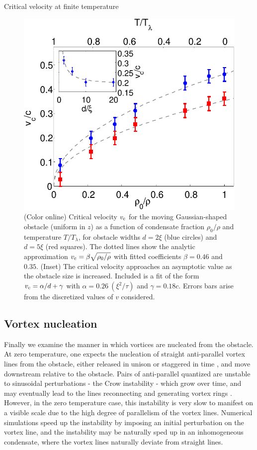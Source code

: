 \begin{chapter}{\label{cha:nonequib}Critical velocity at finite temperature}
\begin{figure}[h]
\centering
  \includegraphics[width=0.45\linewidth]{nonequib/figures/vc-n0}
  \caption{\label{fig:vc-n0}(Color online) Critical velocity $v_{\rm c}$ for the moving Gaussian-shaped obstacle (uniform in $z$) as a function of condensate fraction $\rho_0/\rho$ and temperature $T/T_\lambda$, for obstacle widths $d=2\xi$ (blue circles) and $d=5\xi$ (red squares). The dotted lines show the analytic approximation $v_{\rm c}=\beta \sqrt{\rho_0/\rho}$ with fitted coefficients $\beta=0.46$ and $0.35$. (Inset) The critical velocity approaches an asymptotic value as the obstacle size is increased. Included is a fit of the form $v_{\rm c}=\alpha/d+\gamma$ with $\alpha=0.26~(\xi^2/\tau)$ and $\gamma=0.18 c$.  Errors bars arise from the discretized values of $v$ considered.}
\end{figure}

\subsection{Vortex nucleation}

Finally we examine the manner in which vortices are nucleated from the obstacle.  At zero temperature, one expects the nucleation of straight anti-parallel vortex lines from the obstacle, either released in unison or staggered in time \cite{saito_2010,stagg_2014}, and move downstream relative to the obstacle.  Pairs of anti-parallel quantized are unstable to sinusoidal perturbations - the Crow instability - which grow over time, and may eventually lead to the lines reconnecting and generating vortex rings \cite{berloff_2001,simula_2011,zuccher_2012}.  However, in the zero temperature case, this instability is very slow to manifest on a visible scale due to the high degree of parallelism of the vortex lines.  Numerical simulations speed up the instability by imposing an initial perturbation on the vortex line, and the instability may be naturally sped up in an inhomogeneous condensate, where the vortex lines naturally deviate from straight lines.


\end{chapter}
